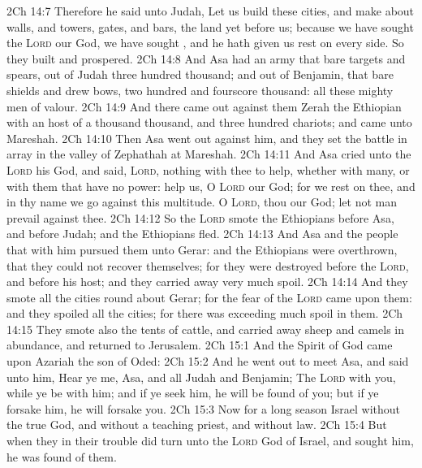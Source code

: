 \vs 2Ch 14:7 Therefore he said unto Judah, Let us build these cities, and make about  walls, and towers, gates, and bars,  the land  yet before us; because we have sought the \textsc{Lord} our God, we have sought , and he hath given us rest on every side. So they built and prospered.
\vs 2Ch 14:8 And Asa had an army  that bare targets and spears, out of Judah three hundred thousand; and out of Benjamin, that bare shields and drew bows, two hundred and fourscore thousand: all these  mighty men of valour.
\vs 2Ch 14:9 And there came out against them Zerah the Ethiopian with an host of a thousand thousand, and three hundred chariots; and came unto Mareshah.
\vs 2Ch 14:10 Then Asa went out against him, and they set the battle in array in the valley of Zephathah at Mareshah.
\vs 2Ch 14:11 And Asa cried unto the \textsc{Lord} his God, and said, \textsc{Lord},  nothing with thee to help, whether with many, or with them that have no power: help us, O \textsc{Lord} our God; for we rest on thee, and in thy name we go against this multitude. O \textsc{Lord}, thou  our God; let not man prevail against thee.
\vs 2Ch 14:12 So the \textsc{Lord} smote the Ethiopians before Asa, and before Judah; and the Ethiopians fled.
\vs 2Ch 14:13 And Asa and the people that  with him pursued them unto Gerar: and the Ethiopians were overthrown, that they could not recover themselves; for they were destroyed before the \textsc{Lord}, and before his host; and they carried away very much spoil.
\vs 2Ch 14:14 And they smote all the cities round about Gerar; for the fear of the \textsc{Lord} came upon them: and they spoiled all the cities; for there was exceeding much spoil in them.
\vs 2Ch 14:15 They smote also the tents of cattle, and carried away sheep and camels in abundance, and returned to Jerusalem.
\vs 2Ch 15:1 And the Spirit of God came upon Azariah the son of Oded:
\vs 2Ch 15:2 And he went out to meet Asa, and said unto him, Hear ye me, Asa, and all Judah and Benjamin; The \textsc{Lord}  with you, while ye be with him; and if ye seek him, he will be found of you; but if ye forsake him, he will forsake you.
\vs 2Ch 15:3 Now for a long season Israel  without the true God, and without a teaching priest, and without law.
\vs 2Ch 15:4 But when they in their trouble did turn unto the \textsc{Lord} God of Israel, and sought him, he was found of them.
